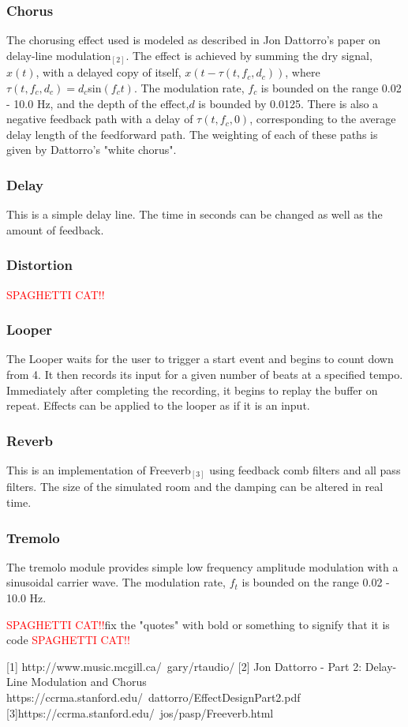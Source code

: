 \documentclass[pdftext,twoside,10pt]{article}
\newcommand{\spag}{\textcolor{red}{SPAGHETTI CAT!!}}
\begin{document}
\subsubsection{Chorus} 
The chorusing effect used is modeled as described in Jon Dattorro's paper on delay-line modulation$_{[2]}$. The effect is achieved by summing the dry signal, $x(t)$, with a delayed copy of itself, $x(t - \tau(t,f_c,d_c))$, where $\tau(t,f_c,d_c) =d_c$sin$(f_ct)$. The modulation rate, $f_c$ is bounded on the range 0.02 - 10.0 Hz, and the depth of the effect,$d$ is bounded by 0.0125. There is also a negative feedback path with a delay of $\tau(t,f_c,0)$, corresponding to the average delay length of the feedforward path. The weighting of each of these paths is given by Dattorro's "white chorus".

\subsubsection{Delay}
This is a simple delay line. The time in seconds can be changed as well as the amount of feedback.

\subsubsection{Distortion}
\spag

\subsubsection{Looper}
The Looper waits for the user to trigger a start event and begins to count down from 4. It then records its input for a given number of beats at a specified tempo. Immediately after completing the recording, it begins to replay the buffer on repeat. Effects can be applied to the looper as if it is an input. 

\subsubsection{Reverb}
This is an implementation of Freeverb$_{[3]}$ using feedback comb filters and all pass filters. The size of the simulated room and the damping can be altered in real time.

\subsubsection{Tremolo} 
The tremolo module provides simple low frequency amplitude modulation with a sinusoidal carrier wave. The modulation rate, $f_t$ is bounded on the range 0.02 - 10.0 Hz.


\spag fix the "quotes" with bold or something to signify that it is code \spag

[1] http://www.music.mcgill.ca/~gary/rtaudio/
[2] Jon Dattorro - Part 2: Delay-Line Modulation and Chorus  
https://ccrma.stanford.edu/~dattorro/EffectDesignPart2.pdf 
[3]https://ccrma.stanford.edu/~jos/pasp/Freeverb.html 
\end{document}
